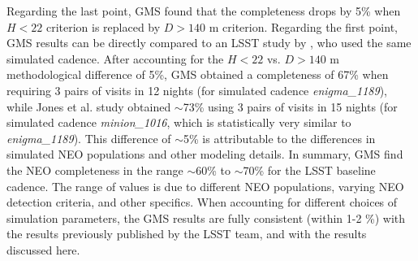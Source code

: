 Regarding the last point, GMS found that the completeness drops by 5\% when $H<22$ criterion is
replaced by $D>140$ m criterion. Regarding  the first point, GMS results can be directly compared to an
LSST study by \cite{JJI2016}, who used the same simulated cadence. After accounting for the $H<22$ vs.
$D>140$ m methodological difference of 5\%, GMS obtained a completeness of 67\% when requiring
3 pairs of visits in 12 nights (for simulated cadence {\it enigma\_1189}), while Jones et al.
study obtained $\sim$73\% using 3 pairs of visits in 15 nights (for simulated cadence {\it minion\_1016},
which is statistically very similar to {\it enigma\_1189}). This difference of $\sim$5\% is attributable to
the differences in simulated NEO populations and other modeling details. In summary, GMS find the NEO
completeness in the range $\sim$60\% to $\sim$70\% for the LSST baseline cadence. The range of values
is due to different NEO populations, varying NEO detection criteria, and other specifics. When accounting
for different choices of simulation parameters, the GMS results are fully consistent (within 1-2 \%) with
the results previously published by the LSST team, and with the results discussed here.
